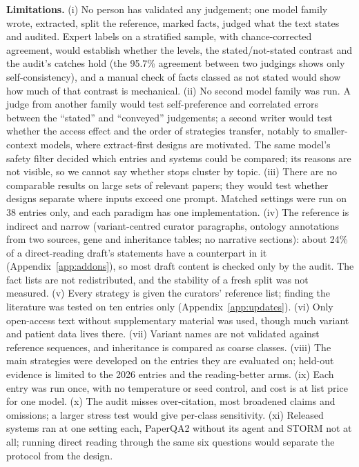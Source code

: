 \documentclass{article} %
\begin{document}
\textbf{Limitations.} (i) No person has validated any judgement; one model family wrote, extracted, split the reference, marked facts, judged what the text states and audited. Expert labels on a stratified sample, with chance-corrected agreement, would establish whether the levels, the stated/not-stated contrast and the audit's catches hold (the 95.7\% agreement between two judgings shows only self-consistency), and a manual check of facts classed as not stated would show how much of that contrast is mechanical. (ii) No second model family was run. A judge from another family would test self-preference and correlated errors between the ``stated'' and ``conveyed'' judgements; a second writer would test whether the access effect and the order of strategies transfer, notably to smaller-context models, where extract-first designs are motivated. The same model's safety filter decided which entries and systems could be compared; its reasons are not visible, so we cannot say whether stops cluster by topic. (iii) There are no comparable results on large sets of relevant papers; they would test whether designs separate where inputs exceed one prompt. Matched settings were run on 38 entries only, and each paradigm has one implementation. (iv) The reference is indirect and narrow (variant-centred curator paragraphs, ontology annotations from two sources, gene and inheritance tables; no narrative sections): about 24\% of a direct-reading draft's statements have a counterpart in it (Appendix~\ref{app:addons}), so most draft content is checked only by the audit. The fact lists are not redistributed, and the stability of a fresh split was not measured. (v) Every strategy is given the curators' reference list; finding the literature was tested on ten entries only (Appendix~\ref{app:updates}). (vi) Only open-access text without supplementary material was used, though much variant and patient data lives there. (vii) Variant names are not validated against reference sequences, and inheritance is compared as coarse classes. (viii) The main strategies were developed on the entries they are evaluated on; held-out evidence is limited to the 2026 entries and the reading-better arms. (ix) Each entry was run once, with no temperature or seed control, and cost is at list price for one model. (x) The audit misses over-citation, most broadened claims and omissions; a larger stress test would give per-class sensitivity. (xi) Released systems ran at one setting each, PaperQA2 without its agent and STORM not at all; running direct reading through the same six questions would separate the protocol from the design.
\end{document}
